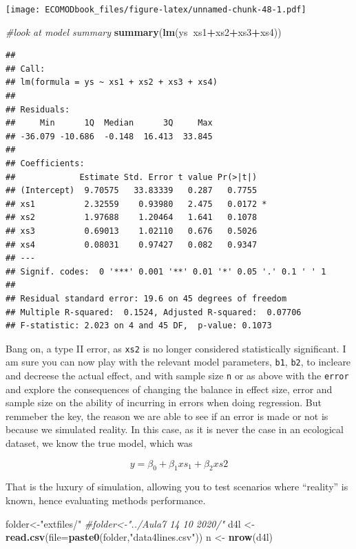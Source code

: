 \documentclass[
]{book}
\newenvironment{Shaded}{\begin{snugshade}}{\end{snugshade}}
\newcommand{\CommentTok}[1]{\textcolor[rgb]{0.56,0.35,0.01}{\textit{#1}}}
\newcommand{\DataTypeTok}[1]{\textcolor[rgb]{0.13,0.29,0.53}{#1}}
\newcommand{\KeywordTok}[1]{\textcolor[rgb]{0.13,0.29,0.53}{\textbf{#1}}}
\newcommand{\NormalTok}[1]{#1}
\newcommand{\OperatorTok}[1]{\textcolor[rgb]{0.81,0.36,0.00}{\textbf{#1}}}
\newcommand{\StringTok}[1]{\textcolor[rgb]{0.31,0.60,0.02}{#1}}
\begin{document}
\texttt{[image: ECOMODbook\_files/figure-latex/unnamed-chunk-48-1.pdf]}

\begin{Shaded}
\begin{Highlighting}[]
\CommentTok{#look at model summary}
\KeywordTok{summary}\NormalTok{(}\KeywordTok{lm}\NormalTok{(ys}\OperatorTok{~}\NormalTok{xs1}\OperatorTok{+}\NormalTok{xs2}\OperatorTok{+}\NormalTok{xs3}\OperatorTok{+}\NormalTok{xs4))}
\end{Highlighting}
\end{Shaded}

\begin{verbatim}
## 
## Call:
## lm(formula = ys ~ xs1 + xs2 + xs3 + xs4)
## 
## Residuals:
##     Min      1Q  Median      3Q     Max 
## -36.079 -10.686  -0.148  16.413  33.845 
## 
## Coefficients:
##             Estimate Std. Error t value Pr(>|t|)  
## (Intercept)  9.70575   33.83339   0.287   0.7755  
## xs1          2.32559    0.93980   2.475   0.0172 *
## xs2          1.97688    1.20464   1.641   0.1078  
## xs3          0.69013    1.02110   0.676   0.5026  
## xs4          0.08031    0.97427   0.082   0.9347  
## ---
## Signif. codes:  0 '***' 0.001 '**' 0.01 '*' 0.05 '.' 0.1 ' ' 1
## 
## Residual standard error: 19.6 on 45 degrees of freedom
## Multiple R-squared:  0.1524,	Adjusted R-squared:  0.07706 
## F-statistic: 2.023 on 4 and 45 DF,  p-value: 0.1073
\end{verbatim}

Bang on, a type II error, as \texttt{xs2} is no longer considered statistically significant. I am sure you can now play with the relevant model parameters, \texttt{b1}, \texttt{b2}, to incleare and decreese the actual effect, and with sample size \texttt{n} or as above with the \texttt{error} and explore the consequences of changing the balance in effect size, error and sample size on the ability of incurring in errors when doing regression. But remmeber the key, the reason we are able to see if an error is made or not is because we simulated reality. In this case, as it is never the case in an ecological dataset, we know the true model, which was

\[y=\beta_0+\beta_1 xs_1+\beta_2 xs2\]

That is the luxury of simulation, allowing you to test scenarios where ``reality'' is known, hence evaluating methods performance.

\begin{Shaded}
\begin{Highlighting}[]
\NormalTok{folder<-}\StringTok{"extfiles/"}
\CommentTok{#folder<-"../Aula7 14 10 2020/"}
\NormalTok{d4l <-}\StringTok{ }\KeywordTok{read.csv}\NormalTok{(}\DataTypeTok{file=}\KeywordTok{paste0}\NormalTok{(folder,}\StringTok{"data4lines.csv"}\NormalTok{))}
\NormalTok{n <-}\StringTok{ }\KeywordTok{nrow}\NormalTok{(d4l)}
\end{Highlighting}
\end{Shaded}
\end{document}
